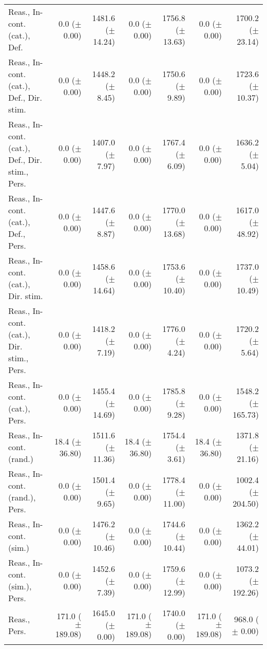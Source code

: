 \begin{table*}
\begin{tabular}{lrrrrrr}
        Reas., In-cont. (cat.), Def. & 0.0 ($\pm$ 0.00) & 1481.6 ($\pm$ 14.24) & 0.0 ($\pm$ 0.00) & 1756.8 ($\pm$ 13.63) & 0.0 ($\pm$ 0.00) & 1700.2 ($\pm$ 23.14) \\
        Reas., In-cont. (cat.), Def., Dir. stim. & 0.0 ($\pm$ 0.00) & 1448.2 ($\pm$ 8.45) & 0.0 ($\pm$ 0.00) & 1750.6 ($\pm$ 9.89) & 0.0 ($\pm$ 0.00) & 1723.6 ($\pm$ 10.37) \\
        Reas., In-cont. (cat.), Def., Dir. stim., Pers. & 0.0 ($\pm$ 0.00) & 1407.0 ($\pm$ 7.97) & 0.0 ($\pm$ 0.00) & 1767.4 ($\pm$ 6.09) & 0.0 ($\pm$ 0.00) & 1636.2 ($\pm$ 5.04) \\
        Reas., In-cont. (cat.), Def., Pers. & 0.0 ($\pm$ 0.00) & 1447.6 ($\pm$ 8.87) & 0.0 ($\pm$ 0.00) & 1770.0 ($\pm$ 13.68) & 0.0 ($\pm$ 0.00) & 1617.0 ($\pm$ 48.92) \\
        Reas., In-cont. (cat.), Dir. stim. & 0.0 ($\pm$ 0.00) & 1458.6 ($\pm$ 14.64) & 0.0 ($\pm$ 0.00) & 1753.6 ($\pm$ 10.40) & 0.0 ($\pm$ 0.00) & 1737.0 ($\pm$ 10.49) \\
        Reas., In-cont. (cat.), Dir. stim., Pers. & 0.0 ($\pm$ 0.00) & 1418.2 ($\pm$ 7.19) & 0.0 ($\pm$ 0.00) & 1776.0 ($\pm$ 4.24) & 0.0 ($\pm$ 0.00) & 1720.2 ($\pm$ 5.64) \\
        Reas., In-cont. (cat.), Pers. & 0.0 ($\pm$ 0.00) & 1455.4 ($\pm$ 14.69) & 0.0 ($\pm$ 0.00) & 1785.8 ($\pm$ 9.28) & 0.0 ($\pm$ 0.00) & 1548.2 ($\pm$ 165.73) \\
        Reas., In-cont. (rand.) & 18.4 ($\pm$ 36.80) & 1511.6 ($\pm$ 11.36) & 18.4 ($\pm$ 36.80) & 1754.4 ($\pm$ 3.61) & 18.4 ($\pm$ 36.80) & 1371.8 ($\pm$ 21.16) \\
        Reas., In-cont. (rand.), Pers. & 0.0 ($\pm$ 0.00) & 1501.4 ($\pm$ 9.65) & 0.0 ($\pm$ 0.00) & 1778.4 ($\pm$ 11.00) & 0.0 ($\pm$ 0.00) & 1002.4 ($\pm$ 204.50) \\
        Reas., In-cont. (sim.) & 0.0 ($\pm$ 0.00) & 1476.2 ($\pm$ 10.46) & 0.0 ($\pm$ 0.00) & 1744.6 ($\pm$ 10.44) & 0.0 ($\pm$ 0.00) & 1362.2 ($\pm$ 44.01) \\
        Reas., In-cont. (sim.), Pers. & 0.0 ($\pm$ 0.00) & 1452.6 ($\pm$ 7.39) & 0.0 ($\pm$ 0.00) & 1759.6 ($\pm$ 12.99) & 0.0 ($\pm$ 0.00) & 1073.2 ($\pm$ 192.26) \\
        Reas., Pers. & 171.0 ($\pm$ 189.08) & 1645.0 ($\pm$ 0.00) & 171.0 ($\pm$ 189.08) & 1740.0 ($\pm$ 0.00) & 171.0 ($\pm$ 189.08) & 968.0 ($\pm$ 0.00) \\

        \bottomrule
    \end{tabular}


\end{table*}
